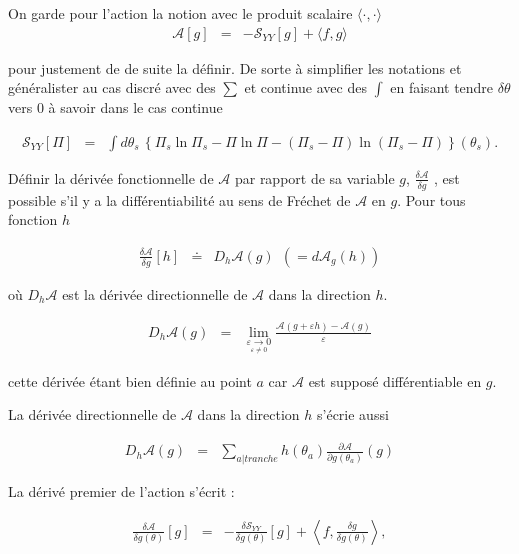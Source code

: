 On garde pour l'action la notion avec le produit scalaire $\langle \cdot , \cdot \rangle$ 
\begin{eqnarray*}
	\mathcal{A}[g] & = & -\mathcal{S}_{YY}[g] + \langle f , g \rangle  
\end{eqnarray*}

pour justement de de suite la définir. De sorte à simplifier les notations et généralister au cas discré avec des $\sum$ et continue avec des $\int$ en faisant tendre $\delta \theta $ vers $0$ à savoir dans le cas continue 

\begin{eqnarray*}
	\mathcal{S}_{YY}[\Pi] & = & \int d\theta_s \, \left \{ \Pi_s  \ln\Pi_s - \Pi  \ln\Pi - ( \Pi_s - \Pi ) \ln ( \Pi_s - \Pi)   \right \}(\theta_s).  		
\end{eqnarray*}

Définir la dérivée fonctionnelle de $\mathcal{A}$ par rapport de sa variable $g$, $\frac{\delta \mathcal{A}}{\delta g}$ ,  est possible s'il y a la différentiabilité au sens de Fréchet de $\mathcal{A}$ en $g$. Pour tous fonction $h$ 

\begin{eqnarray*}
	\frac{\delta \mathcal{A}}{\delta g}[h] & \doteq & D_h \mathcal{A}(g)	~~(= d\mathcal{A}_{g}(h) ) 
\end{eqnarray*}

où $D_h \mathcal{A}$ est la dérivée directionnelle de $\mathcal{A}$ dans la direction $h$.

\begin{eqnarray*}
	D_h \mathcal{A}(g) & = & \lim_{\underset{ \varepsilon \neq 0}{\varepsilon \to 0 }} \frac{ \mathcal{A} ( g + \varepsilon h ) - \mathcal{A} ( g) }{\varepsilon}	
\end{eqnarray*}

cette dérivée étant bien définie au point $a$ car $\mathcal{A}$ est supposé différentiable en $g$.


La dérivée directionnelle de $\mathcal{A}$  dans la direction $h$ s'écrie aussi 

\begin{eqnarray*}
	 D_h \mathcal{A}(g) &= &\sum_{a \vert tranche } h(\theta_a)\frac{\partial \mathcal{A}}{\partial g(\theta_a)}(g) 	
\end{eqnarray*}


La dérivé premier de l'action s'écrit :

\begin{eqnarray*}
	\frac{\delta \mathcal{A}}{\delta g(\theta) }[g] & = & -\frac{\delta \mathcal{S}_{YY}}{\delta g(\theta) }[g] + \left \langle f , \frac{\delta g }{\delta g (\theta) } \right \rangle,  
\end{eqnarray*}

